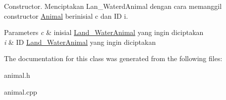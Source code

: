 Constructor. Menciptakan Lan\+\_\+\+Waterd\+Animal dengan cara memanggil constructor \hyperlink{classAnimal}{Animal} berinisial c dan ID i. 


\begin{DoxyParams}{Parameters}
{\em c} & inisial \hyperlink{classLand__WaterAnimal}{Land\+\_\+\+Water\+Animal} yang ingin diciptakan \\
\hline
{\em i} & ID \hyperlink{classLand__WaterAnimal}{Land\+\_\+\+Water\+Animal} yang ingin diciptakan \\
\hline
\end{DoxyParams}


The documentation for this class was generated from the following files\+:\begin{DoxyCompactItemize}
\item 
animal.\+h\item 
animal.\+cpp\end{DoxyCompactItemize}

